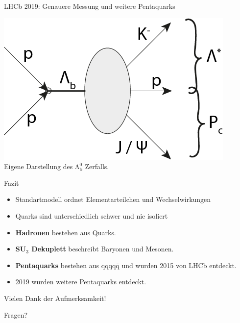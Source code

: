 \documentclass[aspectratio=169]{beamer} %
\begin{document}
\begin{frame}{LHCb 2019: Genauere Messung und weitere Pentaquarks}
\begin{minipage}{0.58\textwidth}
\begin{figure}
          \end{figure}
          \centering
          \includegraphics[width=\textwidth, height=0.3\textheight, keepaspectratio]{FeynmanDiag/gesamt.png}
          \\[-2mm]
          {\scriptsize Eigene Darstellung des $\mathrm{\Lambda_b^0}$ Zerfalls.}
        \end{minipage}
      \end{frame}
    
    \begin{frame}{Fazit}
      \begin{itemize}
        \item Standartmodell ordnet Elementarteilchen und Wechselwirkungen
        \item Quarks sind unterschiedlich schwer und nie isoliert
        \item \textbf{Hadronen} bestehen aus Quarks.
        \item \textbf{SU$_3$ Dekuplett} beschreibt Baryonen und Mesonen.
        \item \textbf{Pentaquarks} bestehen aus $\mathrm{qqqq\bar{q}}$ und wurden 2015 von LHCb entdeckt.
        \item 2019 wurden weitere Pentaquarks entdeckt.
      \end{itemize}
    \end{frame}

    \begin{frame}{Vielen Dank der Aufmerksamkeit!}
      \begin{center}
          \Huge Fragen?
      \end{center}
  \end{frame}
\end{document}
